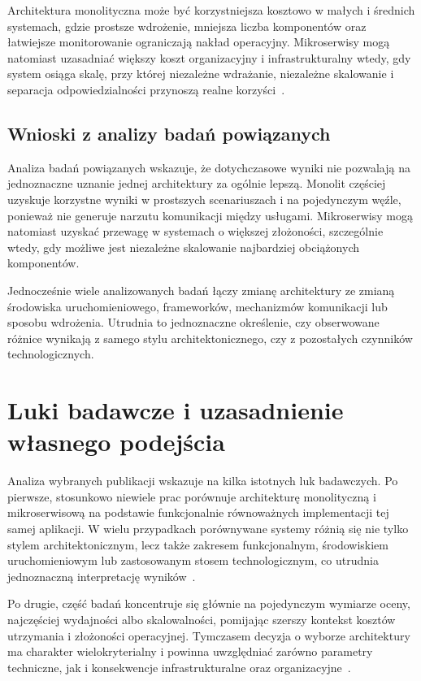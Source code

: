 Architektura monolityczna może być korzystniejsza kosztowo w małych i średnich systemach, gdzie prostsze wdrożenie, mniejsza liczba komponentów oraz łatwiejsze monitorowanie ograniczają nakład operacyjny. Mikroserwisy mogą natomiast uzasadniać większy koszt organizacyjny i infrastrukturalny wtedy, gdy system osiąga skalę, przy której niezależne wdrażanie, niezależne skalowanie i separacja odpowiedzialności przynoszą realne korzyści~\cite{villamizar2017cost,benavente2022comparative,okroj2023differences,mangwani2023evaluation,berry2024migrating}.

\subsection{Wnioski z analizy badań powiązanych}

Analiza badań powiązanych wskazuje, że dotychczasowe wyniki nie pozwalają na jednoznaczne uznanie jednej architektury za ogólnie lepszą. Monolit częściej uzyskuje korzystne wyniki w prostszych scenariuszach i na pojedynczym węźle, ponieważ nie generuje narzutu komunikacji między usługami. Mikroserwisy mogą natomiast uzyskać przewagę w systemach o większej złożoności, szczególnie wtedy, gdy możliwe jest niezależne skalowanie najbardziej obciążonych komponentów.

Jednocześnie wiele analizowanych badań łączy zmianę architektury ze zmianą środowiska uruchomieniowego, frameworków, mechanizmów komunikacji lub sposobu wdrożenia. Utrudnia to jednoznaczne określenie, czy obserwowane różnice wynikają z samego stylu architektonicznego, czy z pozostałych czynników technologicznych.

\section{Luki badawcze i uzasadnienie własnego podejścia}

Analiza wybranych publikacji wskazuje na kilka istotnych luk badawczych. Po pierwsze, stosunkowo niewiele prac porównuje architekturę monolityczną i mikroserwisową na podstawie funkcjonalnie równoważnych implementacji tej samej aplikacji. W wielu przypadkach porównywane systemy różnią się nie tylko stylem architektonicznym, lecz także zakresem funkcjonalnym, środowiskiem uruchomieniowym lub zastosowanym stosem technologicznym, co utrudnia jednoznaczną interpretację wyników~\cite{tapia2020monolithic,benavente2022comparative,berry2024migrating}.

Po drugie, część badań koncentruje się głównie na pojedynczym wymiarze oceny, najczęściej wydajności albo skalowalności, pomijając szerszy kontekst kosztów utrzymania i złożoności operacyjnej. Tymczasem decyzja o wyborze architektury ma charakter wielokryterialny i powinna uwzględniać zarówno parametry techniczne, jak i konsekwencje infrastrukturalne oraz organizacyjne~\cite{papakonstantinou2020technoeconomic,okroj2023differences,mangwani2023evaluation}.

